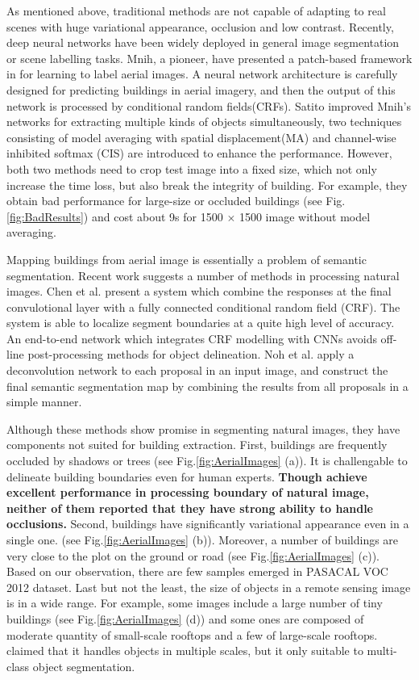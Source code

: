 \documentclass[runningheads]{llncs}
\begin{document}
    As mentioned above, traditional methods are not capable of adapting to real scenes with huge variational appearance, occlusion and low contrast. Recently, deep neural networks have been widely deployed in general image segmentation or scene labelling tasks. Mnih, a pioneer, have presented a patch-based framework in \cite{Mnih2013Machine} for learning to label aerial images. A  neural network architecture is carefully designed for predicting buildings in aerial imagery, and then the output of this network is processed by conditional random fields(CRFs). Satito \cite{Saito2016Multiple} improved Mnih's networks for extracting multiple kinds of objects simultaneously, two techniques consisting of model averaging with spatial displacement(MA) and channel-wise inhibited softmax (CIS) are introduced to enhance the  performance. However, both two methods need to crop test image into a fixed size, which not only increase the time loss, but also break the integrity of building. For example, they obtain bad performance for large-size or occluded buildings (see Fig. \ref{fig:BadResults}) and cost about 9s for 1500 $\times$ 1500 image without model averaging. 
   
   Mapping buildings from aerial image is essentially a problem of semantic segmentation. Recent work suggests a number of methods in processing natural images.  Chen et al. \cite{chen14semantic} present a system which combine the responses at the final convulotional layer with a fully connected conditional random field (CRF). The system is able to localize segment boundaries at a quite high level of accuracy. An end-to-end network \cite{Zheng2015Conditional}  which integrates CRF modelling with CNNs avoids off-line post-processing methods for object delineation. Noh et al. \cite{Noh2015Learning} apply a deconvolution network to each proposal in an input image, and construct the final semantic segmentation map by combining the results from all proposals in a simple manner.
     
   Although these methods show promise in segmenting natural images, they have components not suited for building extraction. First, buildings are frequently occluded by shadows or trees (see Fig.\ref{fig:AerialImages} (a)). It is challengable to delineate building boundaries even for human experts. \textbf{Though \cite{chen14semantic} \cite{Zheng2015Conditional} achieve excellent performance in processing boundary of natural image, neither of them reported that they have strong ability to handle occlusions.}
Second, buildings have significantly variational appearance even in a single one. (see Fig.\ref{fig:AerialImages} (b)). Moreover, a number of buildings are very close to the plot on the ground or road (see Fig.\ref{fig:AerialImages} (c)). Based on our observation, there are few samples emerged in PASACAL VOC 2012 dataset. Last but not the least, the size of objects in a remote sensing image is in a wide range. For example, some images include a large number of tiny buildings (see Fig.\ref{fig:AerialImages} (d)) and some ones are composed of moderate quantity of small-scale rooftops and a few of large-scale rooftops. \cite{Noh2015Learning} claimed that it handles objects in multiple scales, but it only suitable to multi-class object segmentation. 
\end{document}
